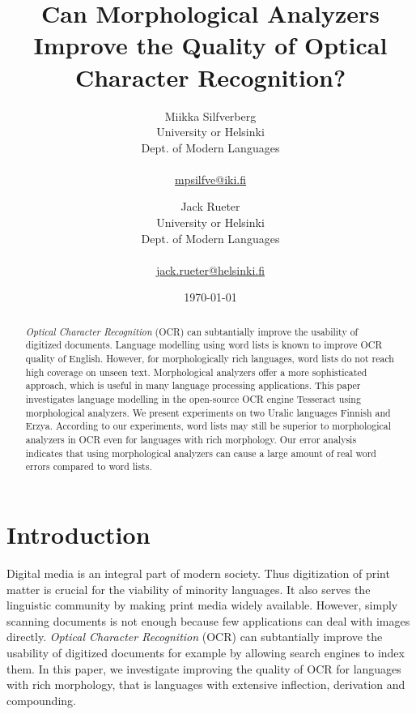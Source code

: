 \documentclass[b5paper]{article}
\begin{document}
\title{Can Morphological Analyzers Improve the Quality of Optical Character Recognition?}

\author{Miikka Silfverberg\\
University or Helsinki\\
Dept. of Modern Languages\\
\\
\url{mpsilfve@iki.fi} \and
Jack Rueter\\
University or Helsinki\\
Dept. of Modern Languages\\
\\
\url{jack.rueter@helsinki.fi} 
}

\date{\today}

\maketitle

\begin{abstract}
  {\it Optical Character Recognition} (OCR) can subtantially improve
  the usability of digitized documents. Language modelling using word
  lists is known to improve OCR quality of English. However, for
  morphologically rich languages, word lists do not reach high
  coverage on unseen text. Morphological analyzers offer a more
  sophisticated approach, which is useful in many language processing
  applications. This paper investigates language modelling in the
  open-source OCR engine Tesseract using morphological analyzers. We
  present experiments on two Uralic languages Finnish and
  Erzya. According to our experiments, word lists may still be
  superior to morphological analyzers in OCR even for languages with
  rich morphology. Our error analysis indicates that using
  morphological analyzers can cause a large amount of real word errors
  compared to word lists.
\end{abstract}

\section{Introduction}

Digital media is an integral part of modern society. Thus digitization
of print matter is crucial for the viability of minority languages. It
also serves the linguistic community by making print media widely
available. However, simply scanning documents is not enough because
few applications can deal with images directly. {\it Optical Character
  Recognition} (OCR) can subtantially improve the usability of
digitized documents for example by allowing search engines to index
them. In this paper, we investigate improving the quality of OCR for
languages with rich morphology, that is languages with extensive
inflection, derivation and compounding.
\end{document}
